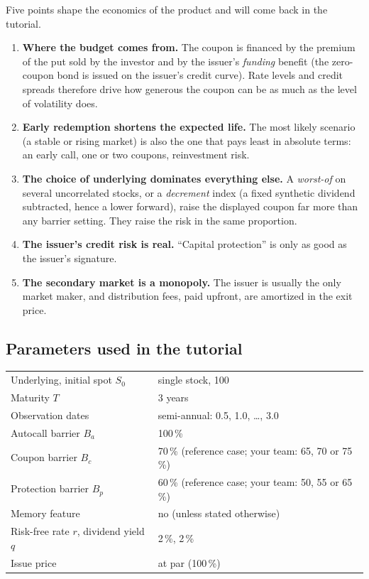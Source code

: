 \documentclass[11pt,a4paper]{article}
\begin{document}
Five points shape the economics of the product and will come back in the tutorial.
\begin{enumerate}
  \item \textbf{Where the budget comes from.} The coupon is financed by the premium of the put sold by the
  investor and by the issuer's \emph{funding} benefit (the zero-coupon bond is issued on the issuer's credit
  curve). Rate levels and credit spreads therefore drive how generous the coupon can be as much as
  the level of volatility does.
  \item \textbf{Early redemption shortens the expected life.} The most likely scenario (a stable or rising
  market) is also the one that pays least in absolute terms: an early call, one or two coupons,
  reinvestment risk.
  \item \textbf{The choice of underlying dominates everything else.} A \emph{worst-of} on several uncorrelated
  stocks, or a \emph{decrement} index (a fixed synthetic dividend subtracted, hence a lower forward), raise
  the displayed coupon far more than any barrier setting. They raise the risk in the same proportion.
  \item \textbf{The issuer's credit risk is real.} ``Capital protection'' is only as good as the issuer's signature.
  \item \textbf{The secondary market is a monopoly.} The issuer is usually the only market maker, and
  distribution fees, paid upfront, are amortized in the exit price.
\end{enumerate}

\subsection{Parameters used in the tutorial}

\begin{center}
\begin{tabular}{@{}l l@{}}
\toprule
Underlying, initial spot $S_0$ & single stock, 100 \\
Maturity $T$ & 3 years \\
Observation dates & semi-annual: 0.5, 1.0, \ldots, 3.0 \\
Autocall barrier $B_a$ & 100\,\% \\
Coupon barrier $B_c$ & 70\,\% (reference case; your team: 65, 70 or 75\,\%) \\
Protection barrier $B_p$ & 60\,\% (reference case; your team: 50, 55 or 65\,\%) \\
Memory feature & no (unless stated otherwise) \\
Risk-free rate $r$, dividend yield $q$ & 2\,\%, 2\,\% \\
Issue price & at par (100\,\%) \\
\bottomrule
\end{tabular}
\end{center}
\end{document}
